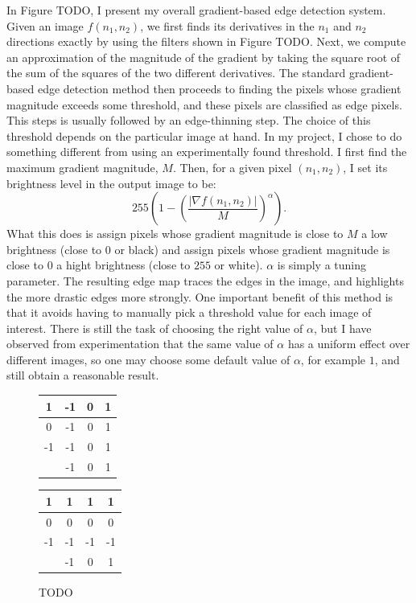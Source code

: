 \documentclass[12pt]{amsart}
\begin{document}
In Figure TODO, I present my overall gradient-based edge detection system. Given an image $f(n_1, n_2)$, we first finds its derivatives in the $n_1$ and $n_2$ directions exactly by using the filters shown in Figure TODO. Next, we compute an approximation of the magnitude of the gradient by taking the square root of the sum of the squares of the two different derivatives. The standard gradient-based edge detection method then proceeds to finding the pixels whose gradient magnitude exceeds some threshold, and these pixels are classified as edge pixels. This steps is usually followed by an edge-thinning step. The choice of this threshold depends on the particular image at hand. In my project, I chose to do something different from using an experimentally found threshold. I first find the maximum gradient magnitude, $M$. Then, for a given pixel $(n_1, n_2)$, I set its brightness level in the output image to be:
\begin{equation*}
255 \left(1 - \left(\frac{|\nabla f(n_1, n_2)|}{M}\right)^\alpha\right).
\end{equation*}
What this does is assign pixels whose gradient magnitude is close to $M$ a low brightness (close to $0$ or black) and assign pixels whose gradient magnitude is close to $0$ a hight brightness (close to $255$ or white). $\alpha$ is simply a tuning parameter. The resulting edge map traces the edges in the image, and highlights the more drastic edges more strongly. One important benefit of this method is that it avoids having to manually pick a threshold value for each image of interest. There is still the task of choosing the right value of $\alpha$, but I have observed from experimentation that the same value of $\alpha$ has a uniform effect over different images, so one may choose some default value of $\alpha$, for example $1$, and still obtain a reasonable result.

\begin{figure}
\begin{minipage}[b]{0.45\linewidth}
\centering
\begin{tabular}{c || c | c | c }
1 & -1 & 0 & 1 \\
\hline
0 & -1 & 0 & 1 \\
\hline
-1 & -1 & 0 & 1 \\
\hline\hline
& -1 & 0 & 1 \\
\end{tabular}
\end{minipage}
\hspace{0.5cm}
\begin{minipage}[b]{0.45\linewidth}
\centering
\begin{tabular}{c || c | c | c }
1 & 1 & 1 & 1 \\
\hline
0 & 0 & 0 & 0 \\
\hline
-1 & -1 & -1 & -1 \\
\hline\hline
& -1 & 0 & 1 \\
\end{tabular}
\end{minipage}
\caption{TODO}
\label{fig:TODO}
\end{figure}
\end{document}
